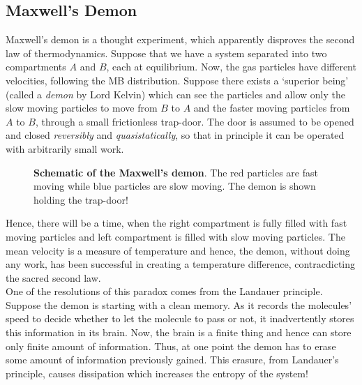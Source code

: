 \subsection{Maxwell's Demon}
Maxwell's demon is a thought experiment, which apparently disproves the second law of thermodynamics. Suppose that we have a system separated into two compartments $A$ and $B$, each at equilibrium. Now, the gas particles have different velocities, following the MB distribution. Suppose there exists a `superior being' (called a \textit{demon} by Lord Kelvin) which can see the particles and allow only the slow moving particles to move from $B$ to $A$ and the faster moving particles from $A$ to $B$, through a small frictionless trap-door. The door is assumed to be opened and closed \textit{reversibly} and \textit{quasistatically}, so that in principle it can be operated with arbitrarily small work. 
\begin{figure}[H]

    \centering


\caption{\textbf{Schematic of the Maxwell's demon}. The red particles are fast moving while blue particles are slow moving. The demon is shown holding the trap-door!}
\end{figure}
\noindent
Hence, there will be a time, when the right compartment is fully filled with fast moving particles and left compartment is filled with slow moving particles. The mean velocity is a measure of temperature and hence, the demon, without doing any work, has been successful in creating a temperature difference, contracdicting the sacred second law. \\[0.2cm]
One of the resolutions of this paradox comes from the Landauer principle. Suppose the demon is starting with a clean memory. As it records the molecules' speed to decide whether to let the molecule to pass or not, it inadvertently stores this information in its brain. Now, the brain is a finite thing and hence can store only finite amount of information. Thus, at one point the demon has to erase some amount of information previously gained. This erasure, from Landauer's principle, causes dissipation which increases the entropy of the system!